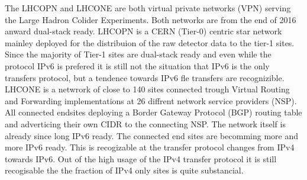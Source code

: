 

The LHCOPN and LHCONE are both virtual private networks (VPN) serving the Large Hadron Colider Experiments. Both networks are from the end of 2016 anward dual-stack ready. LHCOPN is a CERN (Tier-0) centric star network mainley deployed for the distribuion of the raw detector data to the tier-1 sites. Since the majority of Tier-1 sites are dual-stack ready and even while the protocol IPv6 is prefered it is still not the situation that IPv6 is the only transfers protocol, but a tendence towards IPv6 fle transfers are recognizible. LHCONE is a netwrork of close to 140 sites connected trough Virtual Routing and Forwarding implementations at 26 diffrent network service providers (NSP). All connected endsites deploying a Border Gateway Protocol (BGP) routing table and adverticing their own CIDR to the connecting NSP. The network itself is already since long IPv6 ready. The connected end sites are becomming more and more IPv6 ready. This is recogizable at the  transfer protocol changes from IPv4 towards IPv6. Out of the high usage of the IPv4 transfer protocol it is still recogisable the the fraction of IPv4 only sites is quite substancial.

